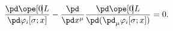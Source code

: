 \begin{equation}	\label{12.46}
\frac{\pd\ope[0\mspace{-3mu}]{L}}{\pd\varphi_i[\sigma;x]}
-
\frac{\pd}{\pd x^\mu}
\frac{\pd\ope[0\mspace{-3mu}]{L}}{\pd( \pd_\mu\varphi_i[\sigma;x])}
=
0 .
	\end{equation}

